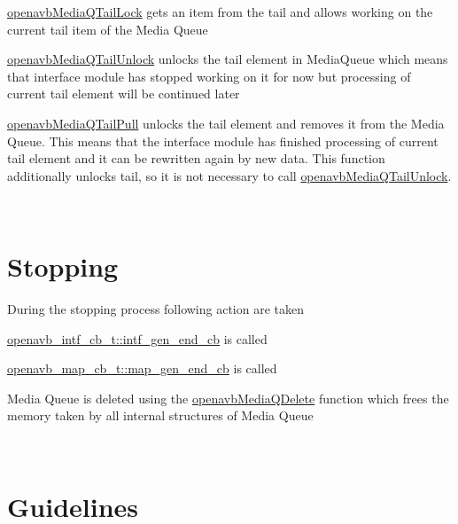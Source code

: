 \begin{DoxyItemize}
\item \hyperlink{mediaq_2openavb__mediaq__pub_8h_aafa1645c7e234bd011a70063d368b995}{openavb\+Media\+Q\+Tail\+Lock} gets an item from the tail and allows working on the current tail item of the Media Queue
\item \hyperlink{mediaq_2openavb__mediaq__pub_8h_a9b57c7a2cfb99521a7e460bd29b3b31a}{openavb\+Media\+Q\+Tail\+Unlock} unlocks the tail element in Media\+Queue which means that interface module has stopped working on it for now but processing of current tail element will be continued later
\item \hyperlink{mediaq_2openavb__mediaq__pub_8h_ab0525761a2b45c4c14d4fdc80fa24c47}{openavb\+Media\+Q\+Tail\+Pull} unlocks the tail element and removes it from the Media Queue. This means that the interface module has finished processing of current tail element and it can be rewritten again by new data. This function additionally unlocks tail, so it is not necessary to call \hyperlink{mediaq_2openavb__mediaq__pub_8h_a9b57c7a2cfb99521a7e460bd29b3b31a}{openavb\+Media\+Q\+Tail\+Unlock}.
\end{DoxyItemize}

~\newline
\hypertarget{sdk_notes_media_queue_usage_media_queue_usage_stop}{}\section{Stopping     }\label{sdk_notes_media_queue_usage_media_queue_usage_stop}
During the stopping process following action are taken


\begin{DoxyItemize}
\item \hyperlink{structopenavb__intf__cb__t_af5c808e5bf832dc6f7d8314c80892171}{openavb\+\_\+intf\+\_\+cb\+\_\+t\+::intf\+\_\+gen\+\_\+end\+\_\+cb} is called
\item \hyperlink{structopenavb__map__cb__t_aefd70fa9d3e6cd61a4b7f1272a1eedcd}{openavb\+\_\+map\+\_\+cb\+\_\+t\+::map\+\_\+gen\+\_\+end\+\_\+cb} is called
\item Media Queue is deleted using the \hyperlink{mediaq_2openavb__mediaq__pub_8h_adddaa9656fd7fcca39d54a3fdb8dc3a9}{openavb\+Media\+Q\+Delete} function which frees the memory taken by all internal structures of Media Queue
\end{DoxyItemize}

~\newline
\hypertarget{sdk_notes_media_queue_usage_media_queue_usage_rules}{}\section{Guidelines    }\label{sdk_notes_media_queue_usage_media_queue_usage_rules}

